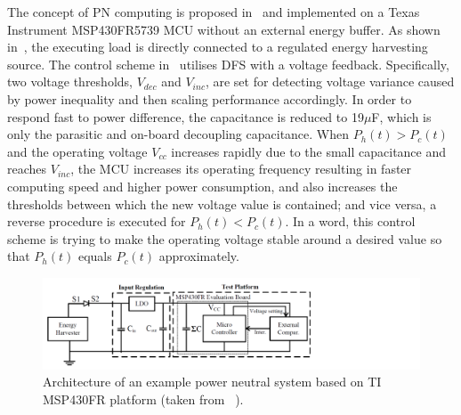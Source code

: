 The concept of PN computing is proposed in~\cite{balsamo2016graceful} and implemented on a Texas Instrument MSP430FR5739 MCU without an external energy buffer. As shown in~, the executing load is directly connected to a regulated energy harvesting source. The control scheme in~\cite{balsamo2016graceful} utilises DFS with a voltage feedback. Specifically, two voltage thresholds, $V_{dec}$ and $V_{inc}$, are set for detecting voltage variance caused by power inequality and then scaling performance accordingly. In order to respond fast to power difference, the capacitance is reduced to 19$\mu$F, which is only the parasitic and on-board decoupling capacitance. When $P_h(t) > P_c(t)$ and the operating voltage $V_{cc}$ increases rapidly due to the small capacitance and reaches $V_{inc}$, the MCU increases its operating frequency resulting in faster computing speed and higher power consumption, and also increases the thresholds between which the new voltage value is contained; and vice versa, a reverse procedure is executed for $P_h(t) < P_c(t)$. In a word, this control scheme is trying to make the operating voltage stable around a desired value so that $P_h(t)$  equals $P_c(t)$ approximately.

\begin{figure}
    \centering
    \includegraphics[width=\columnwidth]{ch2_review/figures/graceful_schematic}
    \caption{Architecture of an example power neutral system based on TI MSP430FR platform (taken from \cite{balsamo2016graceful}~).}
    \label{Figure:graceful_schematic}
\end{figure}

